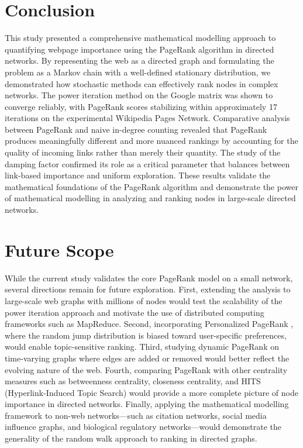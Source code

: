\documentclass[conference]{IEEEtran}
\begin{document}
\section{Conclusion}
This study presented a comprehensive mathematical modelling approach to quantifying webpage importance using the PageRank algorithm in directed networks. By representing the web as a directed graph and formulating the problem as a Markov chain with a well-defined stationary distribution, we demonstrated how stochastic methods can effectively rank nodes in complex networks. The power iteration method on the Google matrix was shown to converge reliably, with PageRank scores stabilizing within approximately 17 iterations on the experimental Wikipedia Pages Network. Comparative analysis between PageRank and naive in-degree counting revealed that PageRank produces meaningfully different and more nuanced rankings by accounting for the quality of incoming links rather than merely their quantity. The study of the damping factor confirmed its role as a critical parameter that balances between link-based importance and uniform exploration. These results validate the mathematical foundations of the PageRank algorithm and demonstrate the power of mathematical modelling in analyzing and ranking nodes in large-scale directed networks.

\section{Future Scope}
While the current study validates the core PageRank model on a small network, several directions remain for future exploration. First, extending the analysis to large-scale web graphs with millions of nodes would test the scalability of the power iteration approach and motivate the use of distributed computing frameworks such as MapReduce. Second, incorporating Personalized PageRank \cite{b8}, where the random jump distribution is biased toward user-specific preferences, would enable topic-sensitive ranking. Third, studying dynamic PageRank \cite{b9} on time-varying graphs where edges are added or removed would better reflect the evolving nature of the web. Fourth, comparing PageRank with other centrality measures such as betweenness centrality, closeness centrality, and HITS (Hyperlink-Induced Topic Search) would provide a more complete picture of node importance in directed networks. Finally, applying the mathematical modelling framework to non-web networks---such as citation networks, social media influence graphs, and biological regulatory networks---would demonstrate the generality of the random walk approach to ranking in directed graphs.
\end{document}
